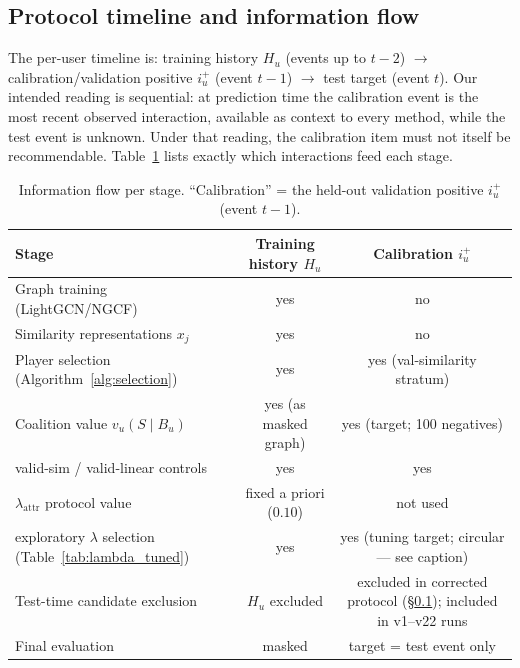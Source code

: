 \documentclass[pdflatex,sn-mathphys-num]{sn-jnl}
\begin{document}
\subsection{Protocol timeline and information flow}\label{subsec:protocol_timeline}

The per-user timeline is: training history $H_u$ (events up to $t-2$) $\rightarrow$ calibration/validation positive $i_u^+$ (event $t-1$) $\rightarrow$ test target (event $t$). Our intended reading is sequential: at prediction time the calibration event is the most recent observed interaction, available as context to every method, while the test event is unknown. Under that reading, the calibration item must not itself be recommendable. Table~\ref{tab:information_flow} lists exactly which interactions feed each stage.

\begin{table}[t]
\caption{Information flow per stage. ``Calibration'' = the held-out validation positive $i_u^+$ (event $t-1$).}\label{tab:information_flow}
\centering
\small
\begin{tabular}{lcc}
\toprule
Stage & Training history $H_u$ & Calibration $i_u^+$ \\
\midrule
Graph training (LightGCN/NGCF) & yes & no \\
Similarity representations $x_j$ & yes & no \\
Player selection (Algorithm~\ref{alg:selection}) & yes & yes (val-similarity stratum) \\
Coalition value $v_u(S\mid B_u)$ & yes (as masked graph) & yes (target; 100 negatives) \\
valid-sim / valid-linear controls & yes & yes \\
$\lambda_{\mathrm{attr}}$ protocol value & fixed a priori ($0.10$) & not used \\
exploratory $\lambda$ selection (Table~\ref{tab:lambda_tuned}) & yes & yes (tuning target; circular --- see caption) \\
Test-time candidate exclusion & $H_u$ excluded & excluded in corrected protocol (\S\ref{subsec:protocol_timeline}); included in v1--v22 runs \\
Final evaluation & masked & target = test event only \\
\bottomrule
\end{tabular}
\end{table}
\end{document}
